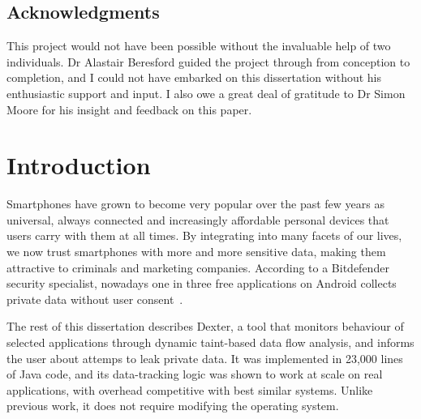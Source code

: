 \documentclass[12pt,twoside,notitlepage]{report}
\begin{document}
\bigskip
\medskip
{}

\cleardoublepage

\tableofcontents

\newpage
\section*{Acknowledgments}

This project would not have been possible without the invaluable help of two individuals. Dr Alastair Beresford guided the project through from conception to completion, and I could not have embarked on this dissertation without his enthusiastic support and input. I also owe a great deal of gratitude to Dr Simon Moore for his insight and feedback on this paper.


\cleardoublepage        %

\setcounter{page}{1}
\pagestyle{headings}

\chapter{Introduction}

Smartphones have grown to become very popular over the past few years as universal, always connected and increasingly affordable personal devices that users carry with them at all times. By integrating into many facets of our lives, we now trust smartphones with more and more sensitive data, making them attractive to criminals and marketing companies. According to a Bitdefender security specialist, nowadays one in three free applications on Android collects private data without user consent~\cite{web:HuffingtonOneInThree}. 

The rest of this dissertation describes Dexter, a tool that monitors behaviour of selected applications through dynamic taint-based data flow analysis, and informs the user about attemps to leak private data. It was implemented in 23,000 lines of Java code, and its data-tracking logic was shown to work at scale on real applications, with overhead competitive with best similar systems. Unlike previous work, it does not require modifying the operating system.
\end{document}

